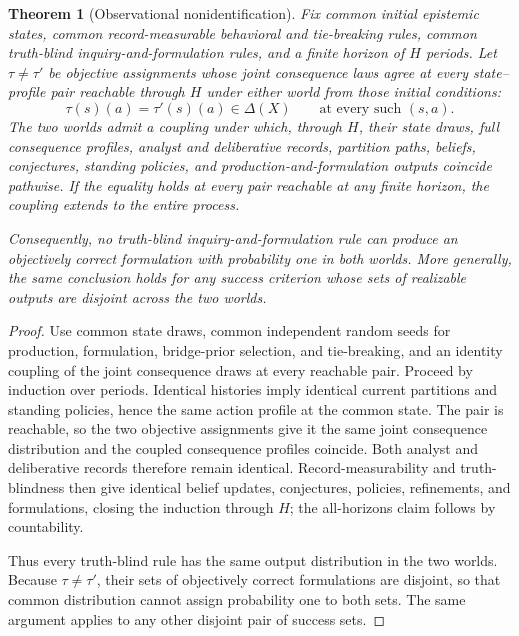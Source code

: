 \documentclass[11pt]{article}
\newtheorem{theorem}[assumption]{Theorem}
\theoremstyle{definition}
\begin{document}
\begin{theorem}[Observational nonidentification]
\label{thm:nonidentification}
Fix common initial epistemic states, common record-measurable behavioral and tie-breaking rules, common truth-blind inquiry-and-formulation rules, and a finite horizon of $H$ periods.
Let $\tau\neq\tau'$ be objective assignments whose \emph{joint} consequence laws agree at every state--profile pair reachable through $H$ under either world from those initial conditions:
\[
\tau(s)(a)=\tau'(s)(a)\in\Delta(X)
\qquad
\text{at every such $(s,a)$.}
\]
The two worlds admit a coupling under which, through $H$, their state draws, full consequence profiles, analyst and deliberative records, partition paths, beliefs, conjectures, standing policies, and production-and-formulation outputs coincide pathwise.
If the equality holds at every pair reachable at any finite horizon, the coupling extends to the entire process.

Consequently, no truth-blind inquiry-and-formulation rule can produce an objectively correct formulation with probability one in both worlds.
More generally, the same conclusion holds for any success criterion whose sets of realizable outputs are disjoint across the two worlds.
\end{theorem}

\begin{proof}
Use common state draws, common independent random seeds for production, formulation, bridge-prior selection, and tie-breaking, and an identity coupling of the joint consequence draws at every reachable pair.
Proceed by induction over periods.
Identical histories imply identical current partitions and standing policies, hence the same action profile at the common state.
The pair is reachable, so the two objective assignments give it the same joint consequence distribution and the coupled consequence profiles coincide.
Both analyst and deliberative records therefore remain identical.
Record-measurability and truth-blindness then give identical belief updates, conjectures, policies, refinements, and formulations, closing the induction through $H$; the all-horizons claim follows by countability.

Thus every truth-blind rule has the same output distribution in the two worlds.
Because $\tau\neq\tau'$, their sets of objectively correct formulations are disjoint, so that common distribution cannot assign probability one to both sets.
The same argument applies to any other disjoint pair of success sets.
\end{proof}
\end{document}
